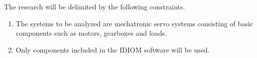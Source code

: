 The research will be delimited by the following constraints.
\begin{enumerate}[itemsep=0pt, topsep=3pt, partopsep=3pt, label=\Roman*]
\item The systems to be analyzed are mechatronic servo systems consisting of basic components such as motors, gearboxes and loads.
\item Only components included in the IDIOM software will be used. 
\end{enumerate}


